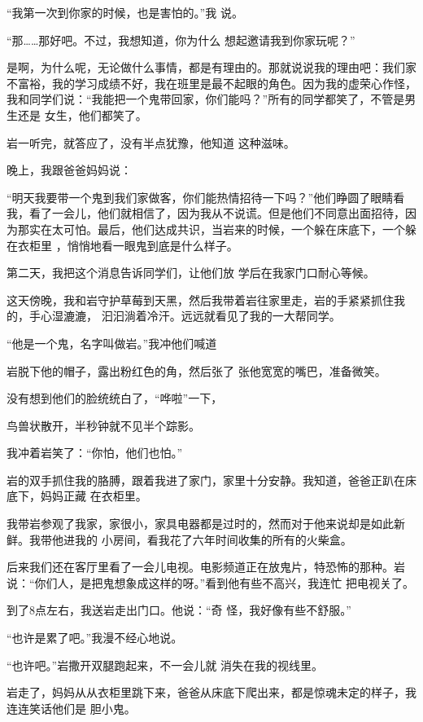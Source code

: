 \documentclass{article}
\begin{document}
“我第一次到你家的时候，也是害怕的。”我
说。 

“那……那好吧。不过，我想知道，你为什么
想起邀请我到你家玩呢？” 

是啊，为什么呢，无论做什么事情，都是有理由的。那就说说我的理由吧：我们家不富裕，我的学习成绩不好，我在班里是最不起眼的角色。因为我的虚荣心作怪，我和同学们说：“我能把一个鬼带回家，你们能吗？”所有的同学都笑了，不管是男生还是
女生，他们都笑了。 

岩一听完，就答应了，没有半点犹豫，他知道
这种滋味。 


\newpage

晚上，我跟爸爸妈妈说： 

“明天我要带一个鬼到我们家做客，你们能热情招待一下吗？”他们睁圆了眼睛看我，看了一会儿，他们就相信了，因为我从不说谎。但是他们不同意出面招待，因为那实在太可怕。最后，他们达成共识，当岩来的时候，一个躲在床底下，一个躲在衣柜里
，悄悄地看一眼鬼到底是什么样子。 

第二天，我把这个消息告诉同学们，让他们放
学后在我家门口耐心等候。 

这天傍晚，我和岩守护草莓到天黑，然后我带着岩往家里走，岩的手紧紧抓住我的，手心湿漉漉，
汩汩淌着冷汗。远远就看见了我的一大帮同学。 

“他是一个鬼，名字叫做岩。”我冲他们喊道

岩脱下他的帽子，露出粉红色的角，然后张了
张他宽宽的嘴巴，准备微笑。 

没有想到他们的脸统统白了，“哗啦”一下，
\newpage

鸟兽状散开，半秒钟就不见半个踪影。 


我冲着岩笑了：“你怕，他们也怕。” 

岩的双手抓住我的胳膊，跟着我进了家门，家里十分安静。我知道，爸爸正趴在床底下，妈妈正藏
在衣柜里。 

我带岩参观了我家，家很小，家具电器都是过时的，然而对于他来说却是如此新鲜。我带他进我的
小房间，看我花了六年时间收集的所有的火柴盒。 

后来我们还在客厅里看了一会儿电视。电影频道正在放鬼片，特恐怖的那种。岩说：“你们人，是把鬼想象成这样的呀。”看到他有些不高兴，我连忙
把电视关了。 

到了8点左右，我送岩走出门口。他说：“奇
怪，我好像有些不舒服。” 


\newpage

“也许是累了吧。”我漫不经心地说。 

“也许吧。”岩撒开双腿跑起来，不一会儿就
消失在我的视线里。 

岩走了，妈妈从从衣柜里跳下来，爸爸从床底下爬出来，都是惊魂未定的样子，我连连笑话他们是
胆小鬼。 
\end{document}
